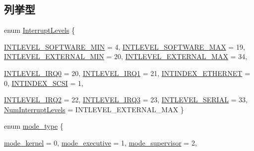 \subsection*{列挙型}
\begin{DoxyCompactItemize}
\item 
enum \hyperlink{namespaceAlphaISA_aa201d1f9b8ac67b80bdf6c08f370558c}{InterruptLevels} \{ \par
\hyperlink{namespaceAlphaISA_aa201d1f9b8ac67b80bdf6c08f370558ca88adb4d39e622bee9138a72de9b75dbf}{INTLEVEL\_\-SOFTWARE\_\-MIN} =  4, 
\hyperlink{namespaceAlphaISA_aa201d1f9b8ac67b80bdf6c08f370558ca42283470a6f9edde0640fe389f0923c0}{INTLEVEL\_\-SOFTWARE\_\-MAX} =  19, 
\hyperlink{namespaceAlphaISA_aa201d1f9b8ac67b80bdf6c08f370558ca5bafe7db9166b1b771927b598c5bdb69}{INTLEVEL\_\-EXTERNAL\_\-MIN} =  20, 
\hyperlink{namespaceAlphaISA_aa201d1f9b8ac67b80bdf6c08f370558ca7ad4f1039bf43f99bcc4646a5a7125c9}{INTLEVEL\_\-EXTERNAL\_\-MAX} =  34, 
\par
\hyperlink{namespaceAlphaISA_aa201d1f9b8ac67b80bdf6c08f370558ca1d59f88cd22bfa77731bd6901a322a28}{INTLEVEL\_\-IRQ0} =  20, 
\hyperlink{namespaceAlphaISA_aa201d1f9b8ac67b80bdf6c08f370558ca6f91d7932be0aefa29b9d6c9e73243a6}{INTLEVEL\_\-IRQ1} =  21, 
\hyperlink{namespaceAlphaISA_aa201d1f9b8ac67b80bdf6c08f370558ca3038a9544c77113b06ff7927474bca85}{INTINDEX\_\-ETHERNET} =  0, 
\hyperlink{namespaceAlphaISA_aa201d1f9b8ac67b80bdf6c08f370558caf7f545d2095c0fbb8a1c2fb3ad8ba947}{INTINDEX\_\-SCSI} =  1, 
\par
\hyperlink{namespaceAlphaISA_aa201d1f9b8ac67b80bdf6c08f370558caeffd94245750f2425c81d89d863aef9e}{INTLEVEL\_\-IRQ2} =  22, 
\hyperlink{namespaceAlphaISA_aa201d1f9b8ac67b80bdf6c08f370558ca11505da41aee172a0c93fd2783b608a6}{INTLEVEL\_\-IRQ3} =  23, 
\hyperlink{namespaceAlphaISA_aa201d1f9b8ac67b80bdf6c08f370558cac9ef7357d98cc6e509a35b6c9af80d57}{INTLEVEL\_\-SERIAL} =  33, 
\hyperlink{namespaceAlphaISA_aa201d1f9b8ac67b80bdf6c08f370558ca99ca7f61018446c5139d3d7865a5c634}{NumInterruptLevels} =  INTLEVEL\_\-EXTERNAL\_\-MAX
 \}
\item 
enum \hyperlink{namespaceAlphaISA_a19269c193c0c4866cdc4e5abd433f9fc}{mode\_\-type} \{ \par
\hyperlink{namespaceAlphaISA_a19269c193c0c4866cdc4e5abd433f9fcaf24dd055e83953a0eac0581789b006d0}{mode\_\-kernel} =  0, 
\hyperlink{namespaceAlphaISA_a19269c193c0c4866cdc4e5abd433f9fca1a153ce3964f86ad65c31804d55305f2}{mode\_\-executive} =  1, 
\hyperlink{namespaceAlphaISA_a19269c193c0c4866cdc4e5abd433f9fcaba0f60b6ad51837713241f76e66422c1}{mode\_\-supervisor} =  2, 

\end{DoxyCompactItemize}

